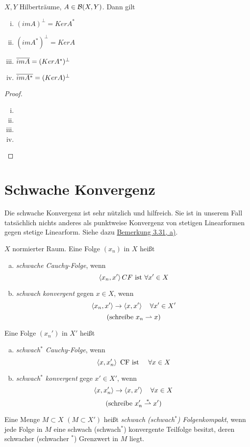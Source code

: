 	\begin{thm}
	\label{3.29}
		$X,Y$ Hilberträume, $A\in \BS$. Dann gilt
			\begin{enumerate}[(i)]
				\item $(imA)^\perp = Ker A^*$
				\item $(imA^*)^\perp = Ker A$
				\item $\overline{imA} = (KerA^*)^\perp$
				\item $\overline{imA^*} = (KerA)^\perp$
			\end{enumerate}
	\end{thm}
	\begin{proof}
		\begin{enumerate}[(i)]
		  \item 
		  \item 
		  \item 
		  \item 
		\end{enumerate}
	\end{proof}
	\section{Schwache Konvergenz}
Die schwache Konvergenz ist sehr nützlich und hilfreich. Sie ist in unserem
Fall tatsächlich nichts anderes als punktweise Konvergenz von
stetigen Linearformen gegen stetige Linearform. 
Siehe dazu \hyperref[bem:3.31]{Bemerkung 3.31, a)}.
	\begin{definition}
	\label{def:3.30}
		$X$ normierter Raum. 
		Eine Folge $(x_n)$ in $X$ heißt 
			\begin{enumerate}[a)]
				\item \textit{schwache Cauchy-Folge}, wenn 
					$$ \left \langle x_n,x' \right \rangle CF \text{ ist }  \forall x' \in X$$
				\item \textit{schwach konvergent} gegen $x\in X$, wenn
					$$ \left \langle x_n, x' \right \rangle \to \left \langle x,x' \right \rangle \quad \forall x' \in X'$$
					$$(\text{schreibe } x_n \rightharpoonup x )$$
			\end{enumerate}
		Eine Folge $(x_n')$ in $X'$ heißt
			\begin{enumerate}[a)]
				\item \textit{schwach$^*$ Cauchy-Folge}, wenn 
					$$ \left \langle x,x_n' \right \rangle \text{ CF ist } \quad \forall x\in X$$
				\item \textit{schwach$^*$ konvergent} gege $x' \in X'$, wenn
					$$ \left \langle x,x_n' \right \rangle \to \left \langle x,x' \right \rangle \quad \forall x\in X $$
					$$(\text{schreibe } x_n' \overset{*}{\rightharpoonup} x')$$
			\end{enumerate}
			Eine Menge $M\subset X$ $(M \subset X')$ heißt \textit{schwach (schwach$^*$) Folgenkompakt}, wenn jede Folge in $M$ eine schwach (schwach$^*$) konvergente Teilfolge besitzt, deren schwacher (schwacher $^*$) Grenzwert in $M$ liegt.
	\end{definition}

